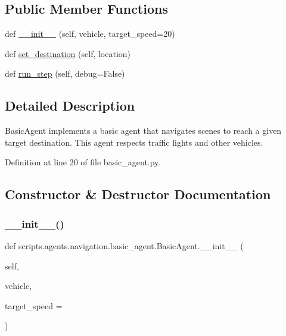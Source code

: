\subsection*{Public Member Functions}
\begin{DoxyCompactItemize}
\item 
def \hyperlink{classscripts_1_1agents_1_1navigation_1_1basic__agent_1_1BasicAgent_a69580567044bfe09eba8da5bebd89beb}{\+\_\+\+\_\+init\+\_\+\+\_\+} (self, vehicle, target\+\_\+speed=20)
\item 
def \hyperlink{classscripts_1_1agents_1_1navigation_1_1basic__agent_1_1BasicAgent_acccc65ae1b4c49557f59b83eb9bc1502}{set\+\_\+destination} (self, location)
\item 
def \hyperlink{classscripts_1_1agents_1_1navigation_1_1basic__agent_1_1BasicAgent_aa6ae836338e7fe24be266108cfe99894}{run\+\_\+step} (self, debug=False)
\end{DoxyCompactItemize}


\subsection{Detailed Description}
\begin{DoxyVerb}BasicAgent implements a basic agent that navigates scenes to reach a given
target destination. This agent respects traffic lights and other vehicles.
\end{DoxyVerb}
 

Definition at line 20 of file basic\+\_\+agent.\+py.



\subsection{Constructor \& Destructor Documentation}
\mbox{\label{classscripts_1_1agents_1_1navigation_1_1basic__agent_1_1BasicAgent_a69580567044bfe09eba8da5bebd89beb}} 
\subsubsection{\texorpdfstring{\+\_\+\+\_\+init\+\_\+\+\_\+()}{\_\_init\_\_()}}
{\footnotesize\ttfamily def scripts.\+agents.\+navigation.\+basic\+\_\+agent.\+Basic\+Agent.\+\_\+\+\_\+init\+\_\+\+\_\+ (\begin{DoxyParamCaption}\item[{}]{self,  }\item[{}]{vehicle,  }\item[{}]{target\+\_\+speed = {} }\end{DoxyParamCaption})}

